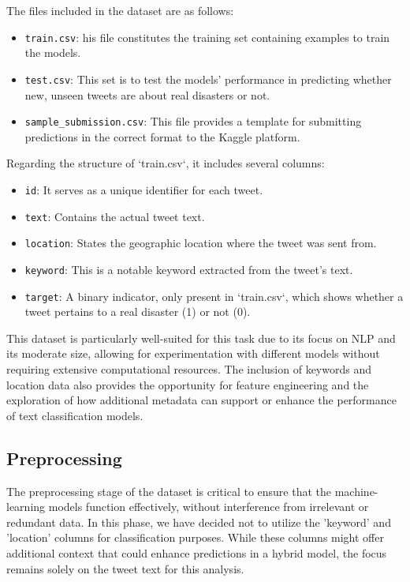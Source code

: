 \documentclass[10pt,table]{article}
\begin{document}
The files included in the dataset are as follows:
\begin{itemize}
    \item \texttt{train.csv}: his file constitutes the training set containing examples to train the models.
    \item \texttt{test.csv}: This set is to test the models' performance in predicting whether new, unseen tweets are about real disasters or not.
    \item \texttt{sample\_submission.csv}: This file provides a template for submitting predictions in the correct format to the Kaggle platform.
\end{itemize}

Regarding the structure of `train.csv`, it includes several columns:
\begin{itemize}
    \item \texttt{id}: It serves as a unique identifier for each tweet.
    \item \texttt{text}: Contains the actual tweet text.
    \item \texttt{location}: States the geographic location where the tweet was sent from.
    \item \texttt{keyword}: This is a notable keyword extracted from the tweet's text.
    \item \texttt{target}: A binary indicator, only present in `train.csv`, which shows whether a tweet pertains to a real disaster (1) or not (0).
\end{itemize}

This dataset is particularly well-suited for this task due to its focus on NLP and its moderate size, allowing for experimentation with different models without requiring extensive computational resources. The inclusion of keywords and location data also provides the opportunity for feature engineering and the exploration of how additional metadata can support or enhance the performance of text classification models.

\subsection{Preprocessing}
The preprocessing stage of the dataset is critical to ensure that the machine-learning models function effectively, without interference from irrelevant or redundant data. In this phase, we have decided not to utilize the 'keyword' and 'location' columns for classification purposes. While these columns might offer additional context that could enhance predictions in a hybrid model, the focus remains solely on the tweet text for this analysis.
\end{document}
